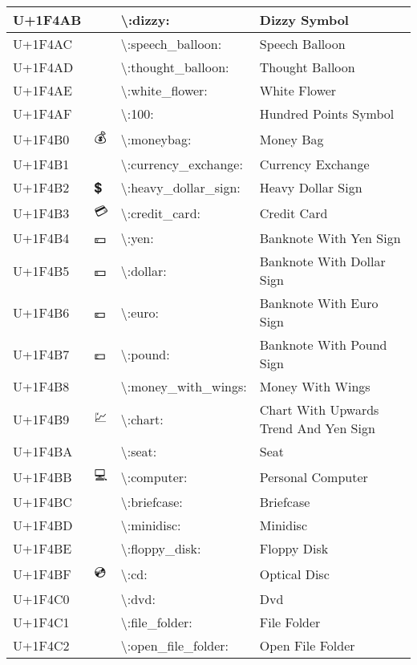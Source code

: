 \begin{table}[h]
\begin{tabulary}{\linewidth}{|L|L|L|L|}
\hline
U+1F4AB & 💫 & {\textbackslash}:dizzy: & Dizzy Symbol \\
\hline
U+1F4AC & 💬 & {\textbackslash}:speech\_balloon: & Speech Balloon \\
\hline
U+1F4AD & 💭 & {\textbackslash}:thought\_balloon: & Thought Balloon \\
\hline
U+1F4AE & 💮 & {\textbackslash}:white\_flower: & White Flower \\
\hline
U+1F4AF & 💯 & {\textbackslash}:100: & Hundred Points Symbol \\
\hline
U+1F4B0 & 💰 & {\textbackslash}:moneybag: & Money Bag \\
\hline
U+1F4B1 & 💱 & {\textbackslash}:currency\_exchange: & Currency Exchange \\
\hline
U+1F4B2 & 💲 & {\textbackslash}:heavy\_dollar\_sign: & Heavy Dollar Sign \\
\hline
U+1F4B3 & 💳 & {\textbackslash}:credit\_card: & Credit Card \\
\hline
U+1F4B4 & 💴 & {\textbackslash}:yen: & Banknote With Yen Sign \\
\hline
U+1F4B5 & 💵 & {\textbackslash}:dollar: & Banknote With Dollar Sign \\
\hline
U+1F4B6 & 💶 & {\textbackslash}:euro: & Banknote With Euro Sign \\
\hline
U+1F4B7 & 💷 & {\textbackslash}:pound: & Banknote With Pound Sign \\
\hline
U+1F4B8 & 💸 & {\textbackslash}:money\_with\_wings: & Money With Wings \\
\hline
U+1F4B9 & 💹 & {\textbackslash}:chart: & Chart With Upwards Trend And Yen Sign \\
\hline
U+1F4BA & 💺 & {\textbackslash}:seat: & Seat \\
\hline
U+1F4BB & 💻 & {\textbackslash}:computer: & Personal Computer \\
\hline
U+1F4BC & 💼 & {\textbackslash}:briefcase: & Briefcase \\
\hline
U+1F4BD & 💽 & {\textbackslash}:minidisc: & Minidisc \\
\hline
U+1F4BE & 💾 & {\textbackslash}:floppy\_disk: & Floppy Disk \\
\hline
U+1F4BF & 💿 & {\textbackslash}:cd: & Optical Disc \\
\hline
U+1F4C0 & 📀 & {\textbackslash}:dvd: & Dvd \\
\hline
U+1F4C1 & 📁 & {\textbackslash}:file\_folder: & File Folder \\
\hline
U+1F4C2 & 📂 & {\textbackslash}:open\_file\_folder: & Open File Folder \\

\end{tabulary}
\end{table}
